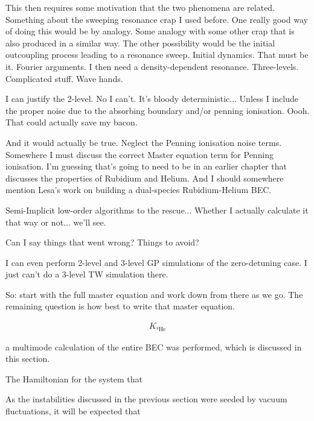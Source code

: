This then requires some motivation that the two phenomena are related. Something about the sweeping resonance crap I used before. One really good way of doing this would be by analogy. Some analogy with some other crap that is also produced in a similar way. The other possibility would be the initial outcoupling process leading to a resonance sweep. Initial dynamics. That must be it. Fourier arguments. I then need a density-dependent resonance. Three-levels. Complicated stuff. Wave hands.

I can justify the 2-level. No I can't. It's bloody deterministic... Unless I include the proper noise due to the absorbing boundary and/or penning ionisation. Oooh. That could actually save my bacon.

And it would actually be true. Neglect the Penning ionisation noise terms. Somewhere I must discuss the correct Master equation term for Penning ionisation. I'm guessing that's going to need to be in an earlier chapter that discusses the properties of Rubidium and Helium. And I should somewhere mention Lesa's work on building a dual-species Rubidium-Helium BEC.

Semi-Implicit low-order algorithms to the rescue... Whether I actually calculate it that way or not... we'll see.

Can I say things that went wrong? Things to avoid?

I can even perform 2-level and 3-level GP simulations of the zero-detuning case. I just can't do a 3-level TW simulation there.

So: start with the full master equation and work down from there as we go. The remaining question is how best to write that master equation.






\begin{align}
    K_{^{4}\text{He}}
\end{align}

a multimode calculation of the entire BEC was performed, which is discussed in this section.


The Hamiltonian for the system that 

As the instabilities discussed in the previous section were seeded by vacuum fluctuations, it will be expected that 

